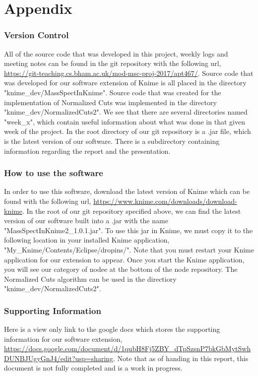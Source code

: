 \documentclass[11pt,openany]{book}
\begin{document}
\printbibliography[heading=bibintoc,title={Bibliography}]

\chapter*{Appendix}

\subsection*{Version Control}
All of the source code that was developed in this project, weekly logs and meeting notes can be found in the git repository with the following url, \url{https://git-teaching.cs.bham.ac.uk/mod-msc-proj-2017/apt467/}. Source code that was developed for our software extension of Knime is all placed in the directory "knime\_dev/MassSpectInKnime". Source code that was created for the implementation of Normalized Cuts was implemented in the directory "knime\_dev/NormalizedCuts2". We see that there are several directories named "week\_x", which contain useful information about what was done in that given week of the project. In the root directory of our git repository is a .jar file, which is the latest version of our software. There is a subdirectory containing information regarding the report and the presentation.

\subsection*{How to use the software}
In order to use this software, download the latest version of Knime which can be found with the following url, \url{https://www.knime.com/downloads/download-knime}. In the root of our git repository specified above, we can find the latest version of our software built into a .jar with the name "MassSpectInKnime2\_1.0.1.jar". To use this jar in Knime, we must copy it to the following location in your installed Knime application, "My\_Knime/Contents/Eclipse/dropins/". Note that you must restart your Knime application for our extension to appear. Once you start the Knime application, you will see our category of nodee at the bottom of the node repository. The Normalized Cuts algorithm can be used in the directiory "knime\_dev/NormalizedCuts2".

\subsection*{Supporting Information}
\label{subsection:Appendix/Supporting_Information}
Here is a view only link to the google docs which stores the supporting information for our software extension, \url{https://docs.google.com/document/d/1qubH8Fj5ZBY\_dTpSzsnP7bkGbMytSwhDUNBJUgyGnJ4/edit?usp=sharing}. Note that as of handing in this report, this document is not fully completed and is a work in progress. 
\end{document}

